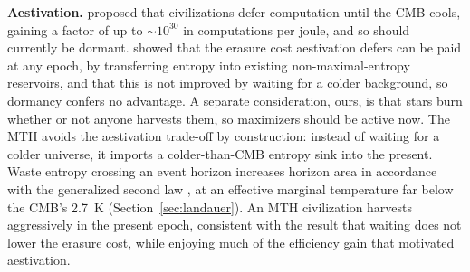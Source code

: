 \documentclass[11pt]{article}
\begin{document}
\textbf{Aestivation.} \citet{Sandberg2016} proposed that civilizations defer computation until the CMB cools, gaining a factor of up to $\sim 10^{30}$ in computations per joule, and so should currently be dormant. \citet{Bennett2019} showed that the erasure cost aestivation defers can be paid at any epoch, by transferring entropy into existing non-maximal-entropy reservoirs, and that this is not improved by waiting for a colder background, so dormancy confers no advantage. A separate consideration, ours, is that stars burn whether or not anyone harvests them, so maximizers should be active now. The MTH avoids the aestivation trade-off by construction: instead of waiting for a colder universe, it imports a colder-than-CMB entropy sink into the present. Waste entropy crossing an event horizon increases horizon area in accordance with the generalized second law \citep{Bekenstein1974}, at an effective marginal temperature far below the CMB's 2.7~K (Section~\ref{sec:landauer}). An MTH civilization harvests aggressively in the present epoch, consistent with the \citet{Bennett2019} result that waiting does not lower the erasure cost, while enjoying much of the efficiency gain that motivated aestivation.
\end{document}
